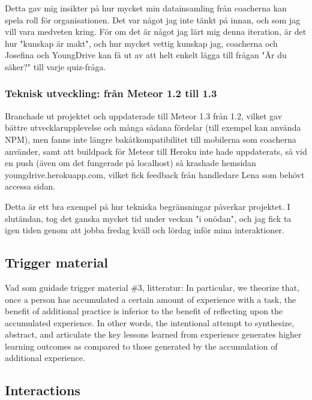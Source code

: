 Detta gav mig insikter på hur mycket min datainsamling från coacherna kan spela roll för organisationen. Det var något jag inte tänkt på innan, och som jag vill vara medveten kring. För om det är något jag lärt mig denna iteration, är det hur "kunskap är makt", och hur mycket vettig kunskap jag, coacherna och Josefina och YoungDrive kan få ut av att helt enkelt lägga till frågan "Är du säker?" till varje quiz-fråga.

\subsubsection{Teknisk utveckling: från Meteor 1.2 till 1.3}
Branchade ut projektet och uppdaterade till Meteor 1.3 från 1.2, vilket gav bättre utvecklarupplevelse och många sådana fördelar (till exempel kan använda NPM), men fanns inte längre bakåtkompatibilitet till mobilerna som coacherna använder, samt att buildpack för Meteor till Heroku inte hade uppdaterats, så vid en push (även om det fungerade på localhost) så krashade hemsidan youngdrive.herokuapp.com, vilket fick feedback från handledare Lena som behövt accessa sidan.

Detta är ett bra exempel på hur tekniska begränsningar påverkar projektet. I slutändan, tog det ganska mycket tid under veckan "i onödan", och jag fick ta igen tiden genom att jobba fredag kväll och lördag inför mina interaktioner.

\subsection*{Trigger material}

Vad som guidade trigger material \#3, litteratur:
In particular, we theorize that, once a person has accumulated a certain amount of experience with a task, the benefit of additional practice is inferior to the benefit of reflecting upon the accumulated experience. In other words, the intentional attempt to synthesize, abstract, and articulate the key lessons learned from experience generates higher learning outcomes as compared to those generated by the accumulation of additional experience.

\subsection*{Interactions}